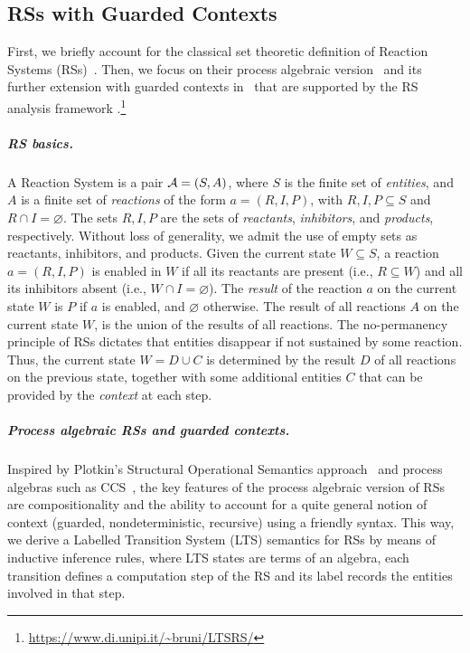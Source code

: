 
\subsection{RSs with Guarded Contexts}\label{sec:RS}

First, we briefly account for the classical set theoretic definition of Reaction Systems (RSs)~\cite{DBLP:journals/fuin/EhrenfeuchtR07}. Then, we focus on their process algebraic version~\cite{DBLP:journals/tcs/BrodoBF21} and its further extension with guarded contexts in~\cite{DBLP:conf/cmsb/BowlesBBFGM24} that are supported by the RS analysis framework \BioResolve.\footnote{\url{https://www.di.unipi.it/~bruni/LTSRS/}}


\subparagraph*{RS basics.}
A Reaction System is a pair ${\cal A} = (S, A)$, where $S$ is the finite set of \emph{entities}, and $A$ is a finite set of \emph{reactions} of the form $a = (R,I,P)$, with $R, I, P\subseteq S$ and $R \cap I = \varnothing$. 
The sets $R, I, P$ are the sets of \emph{reactants}, \emph{inhibitors}, and  \emph{products}, respectively. 
Without loss of generality, we admit the use of empty sets as reactants, inhibitors, and products.
%
Given the current state $W\subseteq S$, a reaction $a = (R,I,P)$ is enabled in $W$ if all its reactants are present (i.e., $R\subseteq W$) and all its inhibitors absent (i.e., $W \cap I = \varnothing$).
The \emph{result} of the reaction $a$ on the current state $W$ is $P$ if $a$ is enabled, and
$\varnothing$ otherwise.
The result of all reactions $A$ on the current state $W$, is the union of the results of all reactions.
%
The no-permanency principle of RSs dictates that entities disappear if not sustained by some reaction.
Thus, the current state $W=D\cup C$ is determined by the result $D$ of all reactions on the previous state, together with some additional entities $C$ that can be provided by the \emph{context} at each step. 

\subparagraph*{Process algebraic RSs and guarded contexts.}
Inspired by Plotkin's Structural Operational Semantics approach~\cite{DBLP:journals/jlp/Plotkin04a} and process algebras such as CCS~\cite{Milner80}, the key features of the process algebraic version of RSs are compositionality and the ability to account for a quite general notion of context (guarded, nondeterministic, recursive) using a friendly syntax. This way, we derive a Labelled Transition System (LTS) semantics for RSs by means of inductive inference rules, where LTS states are terms of an algebra, each transition defines a computation step of the RS and its label records the entities involved in that step.

